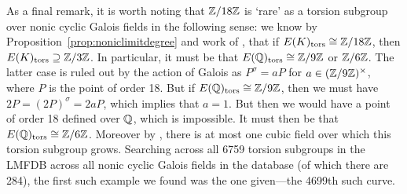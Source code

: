As a final remark, it is worth noting that $\mathbb{Z}/18\mathbb{Z}$ is `rare' as a torsion subgroup over nonic cyclic Galois fields in the following sense: we know by Proposition~\ref{prop:noniclimitdegree} and work of \cite{gonjimnajmantornero16}, that if $E(K)_{\text{tors}} \cong \mathbb{Z}/18\mathbb{Z}$, then $E(K)_{\text{tors}} \supseteq \mathbb{Z}/3\mathbb{Z}$. In particular, it must be that $E(\mathbb{Q})_{\text{tors}} \cong \mathbb{Z}/9\mathbb{Z}$ or $\mathbb{Z}/6\mathbb{Z}$. The latter case is ruled out by the action of Galois as $P^\sigma= aP$ for $a \in (\mathbb{Z}/9\mathbb{Z})^\times$, where $P$ is the point of order 18. But if $E(\mathbb{Q})_{\text{tors}} \cong \mathbb{Z}/9\mathbb{Z}$, then we must have $2P= (2P)^\sigma= 2aP$, which implies that $a= 1$. But then we would have a point of order 18 defined over $\mathbb{Q}$, which is impossible. It must then be that $E(\mathbb{Q})_{\text{tors}} \cong \mathbb{Z}/6\mathbb{Z}$. Moreover by \cite{gonjimnajmantornero16}, there is at most one cubic field over which this torsion subgroup grows. Searching across all 6759 torsion subgroups in the LMFDB across all nonic cyclic Galois fields in the database (of which there are 284), the first such example we found was the one given---the 4699th such curve. 